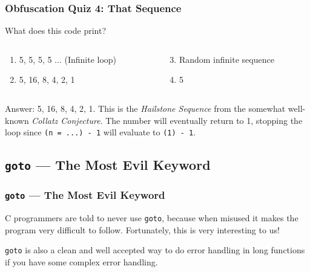 \documentclass[handout,xcolor]{beamer}
\begin{document}
\begin{frame}
	\frametitle{Obfuscation Quiz 4: That Sequence}
	\pause
	
	What does this code print?
	
	
	\pause
	
	\begin{columns}
		\begin{column}{0.45\textwidth}
			\begin{enumerate}
				\item 5, 5, 5, 5 ... (Infinite loop)
				\pause
				\item 5, 16, 8, 4, 2, 1
			\end{enumerate}
		\end{column}
		\pause
		\begin{column}{0.45\textwidth}
			\begin{enumerate}
				\setcounter{enumi}{2}
				\item Random infinite sequence
				\pause
				\item 5
			\end{enumerate}
		\end{column}
	\end{columns}
	\pause
	
	\vspace{0.5cm}
	
	Answer: 5, 16, 8, 4, 2, 1. \pause This is the \textit{Hailstone Sequence} from the somewhat well-known \textit{Collatz Conjecture}. \pause The number will eventually return to 1, stopping the loop since \texttt{(n = ...) - 1} will evaluate to \texttt{(1) - 1}.
\end{frame}

\subsection{\texttt{goto} --- The Most Evil Keyword}

\begin{frame}
	\frametitle{\texttt{goto} --- The Most Evil Keyword}
	\pause
	
	\small
	C programmers are told to never use \texttt{goto}, because when misused it makes the program very difficult to follow. Fortunately, this is very interesting to us!
	\pause
	
	\texttt{goto} is also a clean and well accepted way to do error handling in long functions if you have some complex error handling.
	
	
\end{frame}
\end{document}
